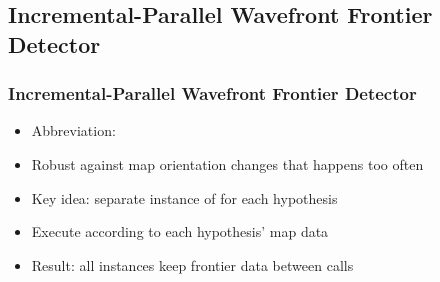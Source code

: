 \subsection*{Incremental-Parallel Wavefront Frontier Detector}
\begin{frame}
\frametitle{Incremental-Parallel Wavefront Frontier Detector}
\begin{itemize}
  \item Abbreviation: \WFDIP
  \item Robust against map orientation changes that happens too often
  \item Key idea: separate instance of \WFDINC for each hypothesis
  \item Execute \WFDINC according to each hypothesis' map data
  \item Result: all \WFDINC instances keep frontier data between
  calls
\end{itemize}
\end{frame}